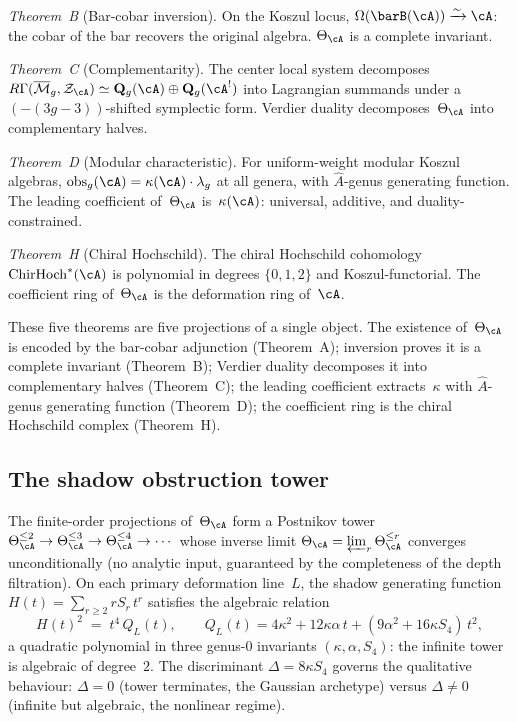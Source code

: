 \smallskip

\emph{Theorem~B} (Bar-cobar inversion).
On the Koszul locus, $\Omega(\barB(\cA))\xrightarrow{\sim}\cA$:
the cobar of the bar recovers the original algebra.
$\Theta_\cA$ is a complete invariant.

\smallskip

\emph{Theorem~C} (Complementarity).
The center local system decomposes
$R\Gamma(\overline{\mathcal M}_g,\mathcal Z_\cA)\simeq
\mathbf Q_g(\cA)\oplus\mathbf Q_g(\cA^!)$ into Lagrangian summands
under a $(-(3g-3))$-shifted symplectic form.
Verdier duality decomposes~$\Theta_\cA$ into complementary halves.

\smallskip

\emph{Theorem~D} (Modular characteristic).
For uniform-weight modular Koszul algebras,
$\mathrm{obs}_g(\cA)=\kappa(\cA)\cdot\lambda_g$ at all genera,
with $\hat A$-genus generating function. The leading coefficient
of~$\Theta_\cA$ is~$\kappa(\cA)$: universal, additive, and
duality-constrained.

\smallskip

\emph{Theorem~H} (Chiral Hochschild).
The chiral Hochschild cohomology $\mathrm{ChirHoch}^*(\cA)$
is polynomial in degrees $\{0,1,2\}$ and Koszul-functorial.
The coefficient ring of~$\Theta_\cA$ is the deformation ring
of~$\cA$.

\medskip

These five theorems are five projections of a single object. The
existence of~$\Theta_\cA$ is encoded by the bar-cobar adjunction
(Theorem~A); inversion proves it is a complete invariant
(Theorem~B); Verdier duality decomposes it into complementary halves
(Theorem~C); the leading coefficient extracts~$\kappa$ with
$\hat A$-genus generating function (Theorem~D); the coefficient ring
is the chiral Hochschild complex (Theorem~H).

\subsection*{The shadow obstruction tower}

The finite-order projections of~$\Theta_\cA$ form a Postnikov tower
$\Theta_\cA^{\leq 2} \to
\Theta_\cA^{\leq 3} \to
\Theta_\cA^{\leq 4} \to \cdots$
whose inverse limit
$\Theta_\cA = \varprojlim_r \Theta_\cA^{\leq r}$
converges unconditionally (no analytic input, guaranteed by
the completeness of the depth filtration).
On each primary deformation line~$L$, the shadow generating
function $H(t)=\sum_{r\ge 2}rS_r\,t^r$ satisfies the algebraic
relation
\begin{equation}\label{eq:preface-riccati-hook}
H(t)^2 \;=\; t^4\,Q_L(t),
\qquad
Q_L(t) = 4\kappa^2+12\kappa\alpha\,t+(9\alpha^2+16\kappa S_4)\,t^2,
\end{equation}
a quadratic polynomial in three genus-$0$ invariants
$(\kappa,\alpha,S_4)$:
the infinite tower is algebraic of degree~$2$. The discriminant
$\Delta = 8\kappa S_4$ governs the qualitative behaviour:
$\Delta=0$ (tower terminates, the Gaussian archetype) versus
$\Delta\neq 0$ (infinite but algebraic, the nonlinear regime).

